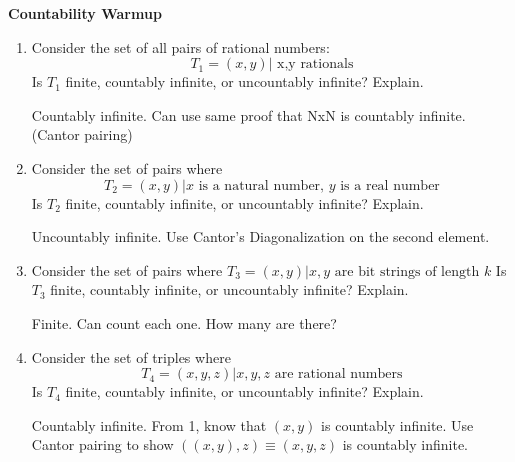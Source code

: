 \question \textbf{Countability Warmup} \newline
\begin{enumerate}[label=(\alph*)]
\item Consider the set of all pairs of rational numbers: 
\[T_1 = {(x, y) | \text{ x,y rationals}}\]
Is $T_1$ finite, countably infinite, or uncountably infinite? Explain.
\begin{solution}
Countably infinite. 
Can use same proof that  NxN is countably infinite. (Cantor pairing)
\end{solution}

\item Consider the set of pairs where 
\[T_2 = {(x,y) | x \text{ is a natural number, }y \text{ is a real number}} \]
Is $T_2$ finite, countably infinite, or uncountably infinite? Explain.
\begin{solution}
Uncountably infinite. 
Use Cantor's Diagonalization on the second element.
\end{solution}

\item Consider the set of pairs where 
$T_3 = {(x,y) | x,y\text{ are bit strings of length }k}$
Is $T_3$ finite, countably infinite, or uncountably infinite? Explain.
\begin{solution}
Finite. Can count each one. How many are there?
\end{solution}

\item Consider the set of triples where 
\[T_4 = { (x,y,z) | x,y,z\text{ are rational numbers}}\]
Is $T_4$ finite, countably infinite, or uncountably infinite? Explain.
\begin{solution}
Countably infinite. From 1, know that $(x, y)$ is countably infinite. Use Cantor pairing to show $((x, y), z) \equiv (x, y ,z)$ is countably infinite.
\end{solution}
\end{enumerate}